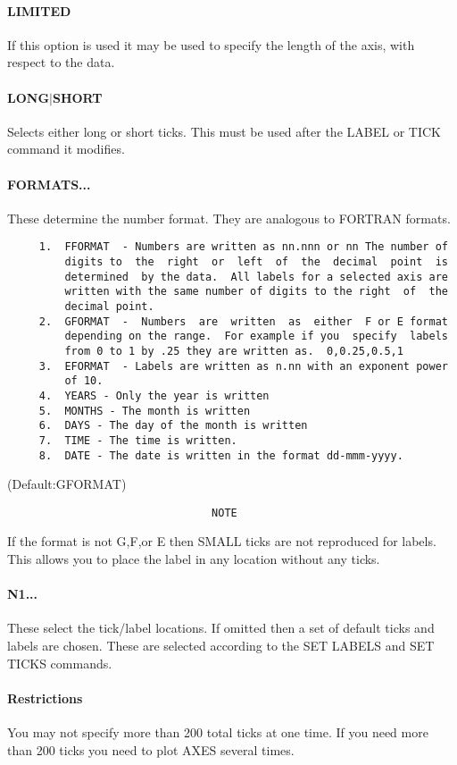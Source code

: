 \paragraph{LIMITED}
If  this  option  is used it may be used to specify the length of the
axis, with respect to the data.  
\paragraph{LONG$|$SHORT}
Selects  either  long  or  short  ticks.  This must be used after the
LABEL or TICK command it modifies.  
\paragraph{FORMATS...}
These  determine  the  number  format.  They are analogous to FORTRAN
formats.  
\begin{verbatim}
     1.  FFORMAT  - Numbers are written as nn.nnn or nn The number of
         digits to  the  right  or  left  of  the  decimal  point  is
         determined  by the data.  All labels for a selected axis are
         written with the same number of digits to the right  of  the
         decimal point.  
     2.  GFORMAT  -  Numbers  are  written  as  either  F or E format
         depending on the range.  For example if you  specify  labels
         from 0 to 1 by .25 they are written as.  0,0.25,0.5,1 
     3.  EFORMAT  - Labels are written as n.nn with an exponent power
         of 10.  
     4.  YEARS - Only the year is written 
     5.  MONTHS - The month is written 
     6.  DAYS - The day of the month is written 
     7.  TIME - The time is written.  
     8.  DATE - The date is written in the format dd-mmm-yyyy.  
\end{verbatim}
(Default:GFORMAT) 

\begin{verbatim}
                                NOTE
\end{verbatim}
If the format is not G,F,or E then SMALL ticks are not reproduced for
labels.  This allows you to place the label in any  location  without
any ticks.  
\paragraph{N1...}
These  select  the  tick/label  locations.   If omitted then a set of
default ticks and labels are chosen.  These are selected according to
the SET LABELS and SET TICKS commands.  
\paragraph{Restrictions}
You  may  not  specify more than 200 total ticks at one time.  If you
need more than 200 ticks you need to plot AXES several times.  

